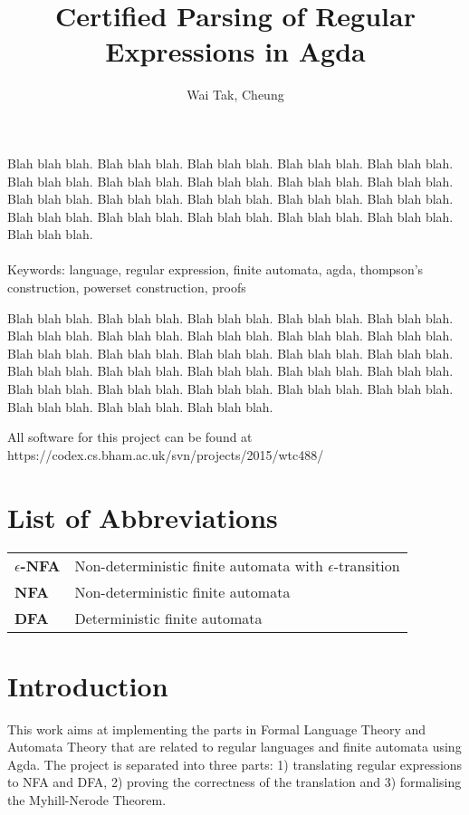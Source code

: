 \documentclass[twoside,openright,final]{bhamthesis}
\title{Certified Parsing of Regular Expressions in Agda}
\author{Wai Tak, Cheung}
\begin{document}
\maketitle

\abstract
\par Blah blah blah. Blah blah blah. Blah blah blah. Blah blah blah. Blah
blah blah. Blah blah blah. Blah blah blah. Blah blah blah.
Blah blah blah. Blah blah blah. Blah blah blah. Blah blah blah. Blah
blah blah.
Blah blah blah. Blah blah blah. Blah blah blah. Blah blah blah.
Blah blah blah. Blah blah blah. Blah blah blah. Blah blah blah. \\ \\
Keywords: language, regular expression, finite automata, agda,
thompson's construction, powerset construction, proofs

\acknowledgments
\par Blah blah blah. Blah blah blah. Blah blah blah. Blah blah blah. Blah
blah blah. Blah blah blah. Blah blah blah.
Blah blah blah. Blah blah blah. Blah blah blah.
Blah blah blah. Blah blah blah. Blah blah blah. Blah blah blah. Blah
blah blah. Blah blah blah. Blah blah blah.
Blah blah blah. Blah blah blah. Blah blah blah. Blah blah blah. Blah
blah blah. Blah blah blah.
Blah blah blah. Blah blah blah. Blah blah blah. Blah blah blah. Blah
blah blah.

\repository
\vspace{7cm}
\begin{center}
  All software for this project can be found at \\
  https://codex.cs.bham.ac.uk/svn/projects/2015/wtc488/
\end{center}

\newpage
\tableofcontents
\newpage

\section{List of Abbreviations}
\begin{tabular}{ll}
  \textbf{\(\epsilon\)-NFA} & Non-deterministic finite automata with
                              \(\epsilon\)-transition \\
  \textbf{NFA} & Non-deterministic finite automata \\
  \textbf{DFA} & Deterministic finite automata 
\end{tabular}

\section{Introduction}
This work aims at implementing the parts in Formal Language Theory and
Automata Theory that are related to regular languages and finite automata
using Agda. The project is separated into three parts: 1) translating
regular expressions to NFA and DFA, 2) proving the correctness of
the translation and 3) formalising the Myhill-Nerode Theorem.
\end{document}
